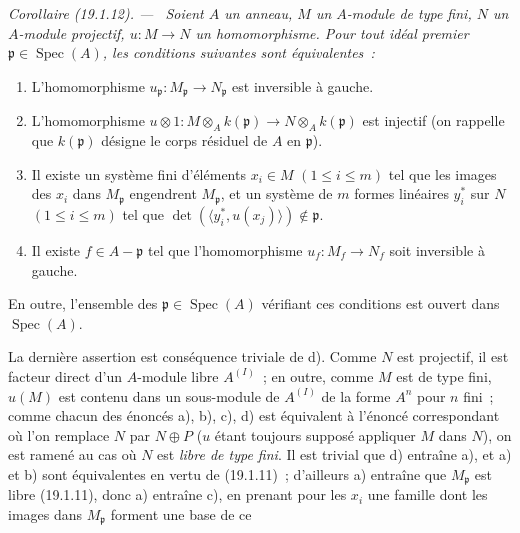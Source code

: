 \documentclass[10pt,oneside]{book}
\makeatletter
\newcommand{\setmanualcurrentlabel}[1]{\def\@currentlabel{#1}}
\newcommand{\oldpage}[2][]{%
  \setcounter{footnote}{0}%
  \marginpar{\scriptsize\textbf{#1}~|~#2}\ignorespaces}
\newenvironment{corollary}[1][]{%
  \setmanualcurrentlabel{#1}\par\medskip\noindent\itshape Corollaire (#1). ---\ }{\par}
\makeatother
\begin{document}
\begin{corollary}[19.1.12]
\label{0.19.1.12-fr}
Soient $A$ un anneau, $M$ un $A$-module de type fini, $N$ un $A$-module
projectif, $u:M\to N$ un homomorphisme. Pour tout idéal premier
$\mathfrak p\in\operatorname{Spec}(A)$, les conditions suivantes sont
équivalentes~:
\begin{enumerate}
  \item[a)] L'homomorphisme
  $u_{\mathfrak p}:M_{\mathfrak p}\to N_{\mathfrak p}$ est inversible à
  gauche.
  \item[b)] L'homomorphisme
  $u\otimes1:M\otimes_Ak(\mathfrak p)\to N\otimes_Ak(\mathfrak p)$ est
  injectif (on rappelle que $k(\mathfrak p)$ désigne le corps résiduel de $A$
  en $\mathfrak p$).
  \item[c)] Il existe un système fini d'éléments $x_i\in M$
  $(1\leq i\leq m)$ tel que les images des $x_i$ dans $M_{\mathfrak p}$
  engendrent $M_{\mathfrak p}$, et un système de $m$ formes linéaires
  $y_i^*$ sur $N$ $(1\leq i\leq m)$ tel que
  $\det(\langle y_i^*,u(x_j)\rangle)\notin\mathfrak p$.
  \item[d)] Il existe $f\in A-\mathfrak p$ tel que l'homomorphisme
  $u_f:M_f\to N_f$ soit inversible à gauche.
\end{enumerate}
En outre, l'ensemble des $\mathfrak p\in\operatorname{Spec}(A)$ vérifiant ces
conditions est ouvert dans $\operatorname{Spec}(A)$.
\end{corollary}

La dernière assertion est conséquence triviale de d). Comme $N$ est
projectif, il est facteur direct d'un $A$-module libre $A^{(I)}$~; en outre,
comme $M$ est de type fini, $u(M)$ est contenu dans un sous-module de $A^{(I)}$
de la forme $A^n$ pour $n$ fini~; comme chacun des énoncés a), b), c), d) est
équivalent à l'énoncé correspondant où l'on remplace $N$ par $N\oplus P$ ($u$
étant toujours supposé appliquer $M$ dans $N$), on est ramené au cas où $N$
est \emph{libre de type fini}. Il est trivial que d) entraîne a), et a) et b)
sont équivalentes en vertu de (19.1.11)~; d'ailleurs a) entraîne que
$M_{\mathfrak p}$ est libre (19.1.11), donc a) entraîne c), en prenant pour les
$x_i$ une famille dont les images dans $M_{\mathfrak p}$ forment une base de ce

\oldpage[0\textsubscript{IV-1}]{77}
\end{document}
